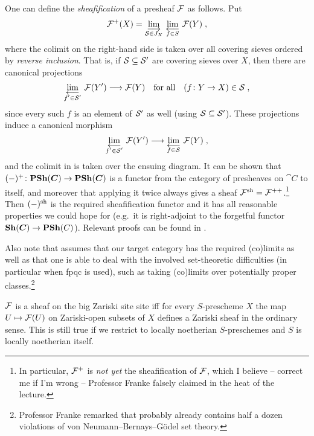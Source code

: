 \documentclass[a4paper,parskip=half,numbers=enddot, DIV=12]{scrreprt}
\begin{document}
\begin{rem}
	One can define the \emph{sheafification} of a presheaf $\mathcal{F}$ as follows. Put
	\begin{align}\lbl{eq:+construction}
		\Ff^+(X)=\colimit[\Ss\in J_X]\limit[f\in S]\Ff(Y)\;,
	\end{align}
	where the colimit on the right-hand side is taken over all covering sieves ordered by \emph{reverse inclusion}. That is, if $\mathcal{S}\subseteq \mathcal{S}'$ are covering sieves over $X$, then there are canonical projections
	\begin{align*}
		\limit[f'\in \Ss']\Ff(Y')\morphism \Ff(Y)\quad\text{for all}\quad(f\colon Y\to X)\in \Ss\;,
	\end{align*}
	since every such $f$ is an element of $\mathcal{S}'$ as well (using $\mathcal{S}\subseteq \mathcal{S}'$). These projections induce a canonical morphism 
	\begin{align*}
		\limit[f'\in\Ss']\Ff(Y')\morphism\limit[f\in \Ss]\Ff(Y)\;,
	\end{align*}
	and the colimit in  is taken over the ensuing diagram. It can be shown that $(-)^+\colon \cat{PSh}(\cat C)\morphism\cat{PSh}(\cat C)$ is a functor from the category of presheaves on $\cat C$ to itself, and moreover that applying it twice always gives a sheaf $\mathcal{F}^{\mathrm{sh}}=\mathcal{F}^{++}$.\footnote{In particular, $\mathcal{F}^+$ is \emph{not yet} the sheafification of $\mathcal{F}$, which  I believe -- correct me if I'm wrong -- Professor Franke falsely claimed in the heat of the lecture.} Then $(-)^{\mathrm{sh}}$ is the required sheafification functor and it has all reasonable properties we could hope for (e.g.\ it is right-adjoint to the forgetful functor $\cat {Sh}(\cat C)\morphism\cat{PSh}(C)$). Relevant proofs can be found in \cite[]{stacks-project}.
	
	Also note that  assumes that our target category has the required (co)limits as well as that one is able to deal with the involved set-theoretic difficulties (in particular when fpqc is used), such as taking (co)limits over potentially proper classes.\footnote{Professor Franke remarked that  probably already contains half a dozen violations of von Neumann--Bernays--Gödel set theory.}
\end{rem}
\begin{example}
	$\mathcal{F}$ is a sheaf on the big Zariski site site iff for every %
	$S$-prescheme $X$ the map $U\mapsto \mathcal{F}(U)$ on Zariski-open subsets of $X$ defines a Zariski sheaf in the ordinary sense. This is still true if we restrict to locally noetherian $S$-preschemes and $S$ is locally noetherian itself.
\end{example}
\end{document}

